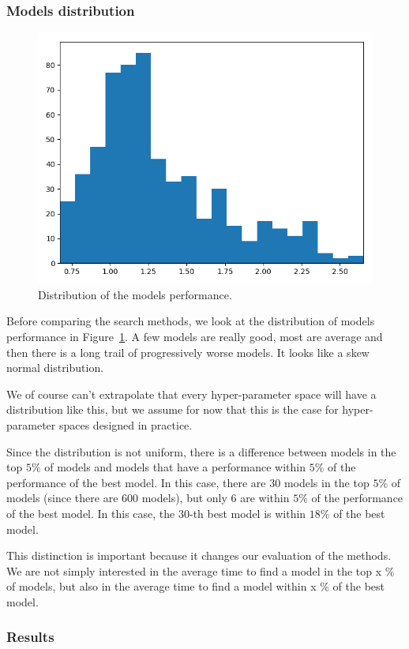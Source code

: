 \subsubsection{Models distribution}

\begin{figure}[htb]
	\centering
	\includegraphics[width=0.7\linewidth]{img_hyperopt/cifar_hist.png}
	\caption{Distribution of the models performance.}
	\label{fig:cifar_hist}
\end{figure}

Before comparing the search methods, we look at the distribution of models performance in Figure~\ref{fig:cifar_hist}. A few models are really good, most are average and then there is a long trail of progressively worse models. It looks like a skew normal distribution. 

We of course can't extrapolate that every hyper-parameter space will have a distribution like this, but we assume for now that this is the case for hyper-parameter spaces designed in practice.

Since the distribution is not uniform, there is a difference between models in the top $5 \%$ of models and models that have a performance within $5 \%$ of the performance of the best model. In this case, there are 30 models in the top $5 \%$ of models (since there are 600 models), but only 6 are within $5 \%$ of the performance of the best model. In this case, the 30-th best model is within $18 \%$ of the best model.

This distinction is important because it changes our evaluation of the methods. We are not simply interested in the average time to find a model in the top x $\%$ of models, but also in the average time to find a model within x $\%$ of the best model.

\subsubsection{Results}

